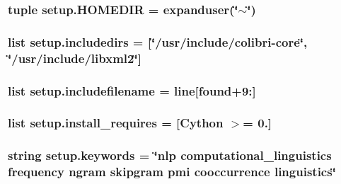 \subsubsection[{H\+O\+M\+E\+D\+I\+R}]{\setlength{\rightskip}{0pt plus 5cm}tuple setup.\+H\+O\+M\+E\+D\+I\+R = expanduser(\char`\"{}$\sim$\char`\"{})}\label{namespacesetup_a5fe113a6f371a2919041a1bf9b992b22}
\hypertarget{namespacesetup_a13490f828556311947276bea73714ae8}{}
\subsubsection[{includedirs}]{\setlength{\rightskip}{0pt plus 5cm}list setup.\+includedirs = \mbox{[}\char`\"{}/usr/include/colibri-\/core\char`\"{}, \char`\"{}/usr/include/libxml2\char`\"{}\mbox{]}}\label{namespacesetup_a13490f828556311947276bea73714ae8}
\hypertarget{namespacesetup_afbe58294e6cd18c22164662529495f97}{}
\subsubsection[{includefilename}]{\setlength{\rightskip}{0pt plus 5cm}list setup.\+includefilename = line\mbox{[}{\bf found}+9\+:\mbox{]}}\label{namespacesetup_afbe58294e6cd18c22164662529495f97}
\hypertarget{namespacesetup_a7cd8314075060c603cd2622ada2c2fbe}{}
\subsubsection[{install\+\_\+requires}]{\setlength{\rightskip}{0pt plus 5cm}list setup.\+install\+\_\+requires = \mbox{[}\textquotesingle{}Cython $>$= 0.\textquotesingle{}\mbox{]}}\label{namespacesetup_a7cd8314075060c603cd2622ada2c2fbe}
\hypertarget{namespacesetup_a13f1455f03aed281ae4f7619aaa7f57b}{}
\subsubsection[{keywords}]{\setlength{\rightskip}{0pt plus 5cm}string setup.\+keywords = \char`\"{}nlp computational\+\_\+linguistics frequency ngram skipgram pmi cooccurrence linguistics\char`\"{}}\label{namespacesetup_a13f1455f03aed281ae4f7619aaa7f57b}
\hypertarget{namespacesetup_ab9de893f1a15246aa1d0172dd4ec87df}{}
